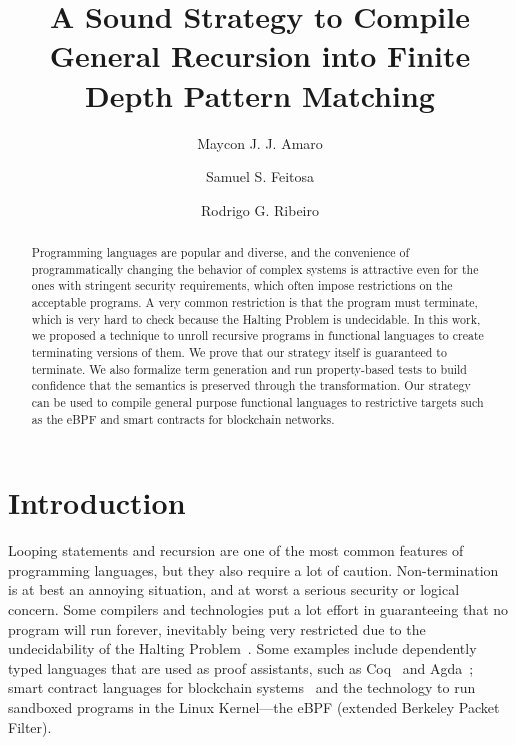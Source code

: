 \documentclass[runningheads]{llncs}
\begin{document}
%
\title{A Sound Strategy to Compile General Recursion into Finite Depth Pattern Matching}
%
%
\author{Maycon J. J. Amaro\and
Samuel S. Feitosa\and
Rodrigo G. Ribeiro}
%
%

\maketitle              %
%
\begin{abstract}
  Programming languages are popular and diverse, and the convenience
  of programmatically changing the behavior of complex systems is attractive 
  even for the ones with stringent security requirements, which often 
  impose restrictions on 
  the acceptable programs. A very common restriction is that the 
  program must terminate, which is very hard to check because the 
  Halting Problem is undecidable. In this work, we proposed a 
  technique to unroll recursive programs in functional languages to 
  create terminating versions of them. We prove that our strategy 
  itself is guaranteed to terminate. We also formalize term generation
  and run property-based tests 
  to build confidence that the semantics is 
  preserved through the transformation.
  Our strategy can be used to compile general purpose functional 
  languages to restrictive targets such as the eBPF and smart 
  contracts for blockchain networks.

\end{abstract}

\section{Introduction}

Looping statements and recursion are one of the 
most common features of programming languages,
but they also require a lot of caution. Non-termination 
is at best
an annoying situation, and at worst a serious 
security or logical concern. Some 
compilers and technologies put a lot effort 
in guaranteeing that no program will run forever,
inevitably being very restricted due 
to the undecidability of the Halting 
Problem~\cite{sipser1996introduction}. Some 
examples include dependently typed languages 
that are used as proof assistants, such as 
Coq~\cite{huet1997coq} and Agda~\cite{norell07}; smart contract languages for 
blockchain systems~\cite{le2018} and the technology to run 
sandboxed programs in the Linux 
Kernel---the eBPF (extended Berkeley Packet Filter).
\end{document}
